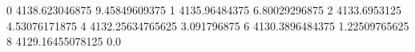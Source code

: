 0 4138.623046875 9.45849609375
1 4135.96484375 6.80029296875
2 4133.6953125 4.53076171875
4 4132.25634765625 3.091796875
6 4130.3896484375 1.22509765625
8 4129.16455078125 0.0
